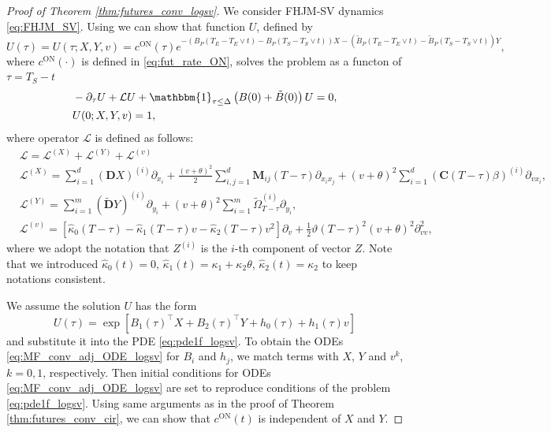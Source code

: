 \documentclass[pdftex,11pt,a4paper] {article}
\begin{document}
\begin{proof}[Proof of Theorem \ref{thm:futures_conv_logsv}]

We consider FHJM-SV dynamics \eqref{eq:FHJM_SV}. Using \cite{Sepp2024} we can show that function $U$, defined by
\begin{equation*}
U(\tau)=U(\tau;X,Y,v)=c^{\mathrm{ON}}(\tau)e^{-\left(B_P(T_E-T_E\vee t)-B_P(T_S-T_S\vee t)\right)X-\left(\tilde B_P(T_E-T_E\vee t)-\tilde B_P(T_S-T_S\vee t)\right)Y},
\end{equation*}
where $c^{\mathrm{ON}}(\cdot)$ is defined in \eqref{eq:fut_rate_ON}, solves the problem as a functon of $\tau=T_S-t$
\begin{equation}\label{eq:pde1f_logsv}
\begin{split}
&-\partial_\tau U+\mathcal{L}U+\mathbbm{1}_{\tau\le \Delta}\left(B(0)+\tilde B(0)\right)U=0,\\
&U(0;X,Y,v)=1, 
\end{split}
\end{equation}
where operator $\mathcal{L}$ is defined as follows:
\begin{equation*}%
\begin{split}
&\mathcal{L}=\mathcal{L}^{(X)}+\mathcal{L}^{(Y)}+\mathcal{L}^{(v)}\\
&\mathcal{L}^{(X)}=\sum_{i=1}^d(\mathbf{D}X)^{(i)}\partial_{x_i}+
\frac{(v+\theta)^2}{2}\sum_{i,j=1}^d\mathbf{M}_{ij}(T-\tau)\partial_{x_ix_j}
+(v+\theta)^2\sum_{i=1}^d(\mathbf{C}(T-\tau)\beta)^{(i)}\partial_{vx_i},\\
&\mathcal{L}^{(Y)}=\sum_{i=1}^m(\tilde{\mathbf{D}}Y)^{(i)}\partial_{y_i}+(v+\theta)^2\sum_{i=1}^m\tilde{\Omega}_{T-\tau}^{(i)}\partial_{y_i},\\
&\mathcal{L}^{(v)}=\left[\hat\kappa_0(T-\tau)-\hat\kappa_1(T-\tau) v-\hat\kappa_2(T-\tau)v^2\right]\partial_v+\frac{1}{2}\vartheta(T-\tau)^2(v+\theta)^2\partial^2_{vv},
\end{split}
\end{equation*}
where we adopt the notation that $Z^{(i)}$ is the $i$-th component of vector $Z$. 
Note that we introduced $\hat\kappa_0(t)=0$, $\hat\kappa_1(t)=\kappa_1+\kappa_2\theta$, $\hat\kappa_2(t)=\kappa_2$ to keep notations consistent. 


We assume the solution $U$ has the form 
\begin{equation}\label{eq:U_aff_exp_logsv}
U(\tau)=\exp\left[B_1(\tau)^\top X+B_2(\tau)^\top Y+h_0(\tau)+h_1(\tau)v \right]
\end{equation}
and substitute it into the PDE \eqref{eq:pde1f_logsv}. 
To obtain the ODEs \eqref{eq:MF_conv_adj_ODE_logsv} for $B_i$ and $h_j$, we match terms with $X$, $Y$ and $v^k$, $k=0,1$, respectively. Then initial conditions for ODEs \eqref{eq:MF_conv_adj_ODE_logsv} are set to reproduce conditions of the problem \eqref{eq:pde1f_logsv}. 
Using same arguments as in the proof of Theorem \ref{thm:futures_conv_cir}, we can show that $c^{\mathrm{ON}}(t)$ is independent of $X$ and $Y$. 
\end{proof}
\end{document}
